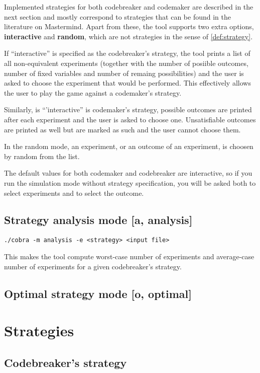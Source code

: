Implemented strategies for both codebreaker and codemaker
  are described in the next section and mostly correspond to strategies
  that can be found in the literature on Mastermind.
Apart from these, the tool supports two extra options, \textbf{interactive}
  and \textbf{random}, which are not strategies in the sense of \autoref{def:strategy}.

If ``interactive'' is specified as the codebreaker's strategy,
  the tool prints a list of all non-equivalent experiments
  (together with the number of posiible outcomes, number of fixed variables
  and number of remaing possibilities) and the user is asked
  to choose the experiment that would be performed.
This effectively allows the user to play the game against a codemaker's strategy.

Similarly, is ``'interactive'' is codemaker's strategy, possible outcomes
  are printed after each experiment and the user is asked to choose one.
Unsatisfiable outcomes are printed as well but are marked as such and
  the user cannot choose them.

In the random mode, an experiment, or an outcome of an experiment, is
  choosen by random from the list.

The default values for both codemaker and codebreaker are interactive,
  so if you run the simulation mode without strategy specification,
  you will be asked both to select experiments and to select the outcome.

\subsection{Strategy analysis mode [a, analysis]}

\centerline{\texttt{./cobra -m analysis -e <strategy> <input file> }}

This makes the tool compute worst-case number of experiments and
average-case number of experiments for a given codebreaker's strategy.


\subsection{Optimal strategy mode [o, optimal]}


\section{Strategies}

\subsection{Codebreaker's strategy}

